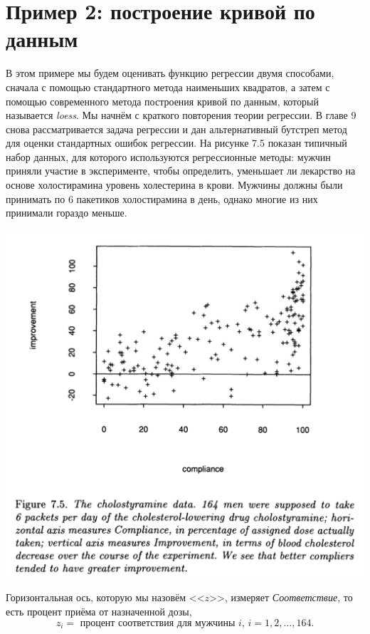 \section{Пример 2: построение кривой по данным}

В этом примере мы будем оценивать функцию регрессии двумя способами, сначала с помощью стандартного метода наименьших квадратов, а затем с помощью современного метода построения кривой по данным, который называется \textit{loess}. Мы начнём с краткого повторения теории регрессии. В главе 9 снова рассматривается задача регрессии и дан альтернативный бутстреп метод для оценки стандартных ошибок регрессии. На рисунке 7.5 показан типичный набор данных, для которого используются регрессионные методы:  мужчин приняли участие в эксперименте, чтобы определить, уменьшает ли лекарство на основе холостирамина уровень холестерина в крови. Мужчины должны были принимать по 6 пакетиков холостирамина в день, однако многие из них принимали гораздо меньше.
\\~\\
\noindent
\includegraphics[width=0.9\linewidth]{6/f75.png}
\newline
\setcounter{figure}{1}

Горизонтальная ось, которую мы назовём <<$z$>>, измеряет \textit{Соответствие}, то есть процент приёма от назначенной дозы,
$$
z_i = \text{ процент соответствия для мужчины } i,\, i = 1,2,\ldots, 164.
$$

